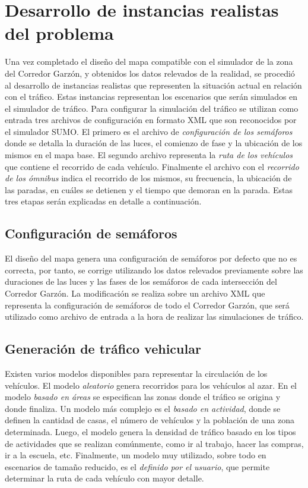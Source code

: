 \section{Desarrollo de instancias realistas del problema}

Una vez completado el diseño del mapa compatible con el simulador de la zona del Corredor Garzón,  y obtenidos los datos relevados de la realidad, se procedió al desarrollo de instancias realistas que representen la situación actual en relación con el tráfico. Estas instancias representan los escenarios que serán simulados en el simulador de tráfico. Para configurar la simulación del tráfico se utilizan como entrada tres archivos de configuración en formato XML que son reconocidos por el simulador SUMO. El primero es el archivo de \emph{configuración de los semáforos} donde se detalla la duración de las luces, el comienzo de fase y la ubicación de los mismos en el mapa base. El segundo archivo representa la \emph{ruta de los vehículos} que contiene el recorrido de cada vehículo. Finalmente el archivo con el \emph{recorrido de los ómnibus} indica el recorrido de los mismos, su frecuencia, la ubicación de las paradas, en cuáles se detienen y el tiempo que demoran en la parada. Estas tres etapas serán explicadas en detalle a continuación.

\subsection{Configuración de semáforos}

El diseño del mapa genera una configuración de semáforos por defecto que no es correcta, por tanto, se corrige utilizando los datos relevados previamente sobre las duraciones de las luces y las fases de los semáforos de cada intersección del Corredor Garzón. La modificación se realiza sobre un archivo XML que representa la configuración de semáforos de todo el Corredor Garzón, que será utilizado como archivo de entrada a la hora de realizar las simulaciones de tráfico.

\subsection{Generación de tráfico vehicular}

Existen varios modelos disponibles para representar la circulación de los vehículos. El modelo \emph{aleatorio} genera recorridos para los vehículos al azar. En el modelo \emph{basado en áreas} se especifican las zonas donde el tráfico se origina y donde finaliza. Un modelo más complejo es el \emph{basado en actividad}, donde se definen la cantidad de casas, el número de vehículos y la población de una zona determinada. Luego, el modelo genera la densidad de tráfico basado en los tipos de actividades que se realizan comúnmente, como ir al trabajo, hacer las compras, ir a la escuela, etc. Finalmente, un modelo muy utilizado, sobre todo en escenarios de tamaño reducido, es el \emph{definido por el usuario}, que permite determinar la ruta de cada vehículo con mayor detalle.

